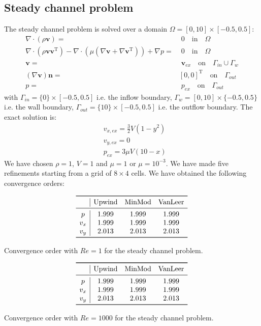 \documentclass[11pt, a4paper]{article}
\theoremstyle{definition}
\begin{document}
\subsection{Steady channel problem}
The steady channel problem is solved over a domain $\Omega = [0,10] \times 
[-0.5, 
0.5]$:
\begin{align*}
\nabla \cdot (\rho \mathbf{v}) =& \; 0 \quad \text{in} \quad \Omega\\
\nabla \cdot (\rho \mathbf{v} \mathbf{v^\mathrm{T}}) - \nabla \cdot (\mu 
(\nabla 
\mathbf{v} + \nabla \mathbf{v}^\mathrm{T})) + 
\nabla p =& \; 0 \quad \text{in} \quad \Omega\\
\mathbf{v} =& \; \mathbf{v}_{ex} \quad \text{on} \quad \Gamma_{in} \cup 
\Gamma_w\\
(\nabla \mathbf{v}) \mathbf{n} =& [0, 0]^\mathrm{T} \quad 
\text{on} 
\quad \Gamma_{out}\\
p =& \; p_{ex} \quad \text{on} \quad \Gamma_{out}
\end{align*}
with $\Gamma_{in} = \{0\} \times [-0.5, 0.5]$ i.e. the inflow boundary, 
$\Gamma_w = [0, 10] \times 
\{-0.5, 
0.5\}$ i.e. the wall boundary, $\Gamma_{out} = \{10\} \times [-0.5, 0.5]$ i.e. 
the outflow boundary.
The exact solution is:
\begin{align*}
&v_{x,ex} = \frac{3}{2} V (1 - y^2)\\
&v_{y,ex} = 0\\
&p_{ex} = 3 \mu V (10 - x)
\end{align*}
We have chosen $\rho = 1$, $V = 1$ and $\mu = 1$ or $ \mu = 10^{-3}$.
We have made five refinements starting from a grid of $8 \times 4$ cells.
We have obtained the following convergence orders:
\begin{table}[h]
	\centering
	\[
	\begin{array}{c|ccc}
	\toprule
	& \text{Upwind} & \text{MinMod} & \text{VanLeer} \\ 
	\midrule
	p & 1.999 & 1.999 & 1.999\\
	v_x & 1.999 & 1.999 & 1.999\\
	v_y & 2.013 & 2.013 & 2.013\\
	\bottomrule
	\end{array}
	\]
	\caption{Convergence order with $Re = 1$ for the steady channel problem.}
	\label{tab:cha_lre}
	
	\[
	\begin{array}{c|ccc}
	\toprule
	& \text{Upwind} & \text{MinMod} & \text{VanLeer} \\ 
	\midrule
	p & 1.999 & 1.999 & 1.999\\
	v_x & 1.999 & 1.999 & 1.999\\
	v_y & 2.013 & 2.013 & 2.013\\
	\bottomrule
	\end{array}
	\]
	\caption{Convergence order with $Re = 1000$ for the steady channel 
	problem.}
	\label{tab:cha_hre}
\end{table}
\end{document}
